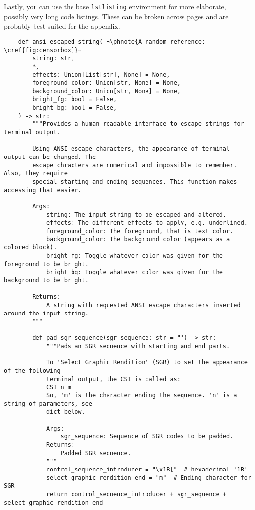 Lastly, you can use the base \texttt{lstlisting} environment for more elaborate,
possibly very long code listings.
These can be broken across pages and are probably best suited for the appendix.
\begin{lstlisting}
    def ansi_escaped_string( ¬\phnote{A random reference: \cref{fig:censorbox}}¬
        string: str,
        *,
        effects: Union[List[str], None] = None,
        foreground_color: Union[str, None] = None,
        background_color: Union[str, None] = None,
        bright_fg: bool = False,
        bright_bg: bool = False,
    ) -> str:
        """Provides a human-readable interface to escape strings for terminal output.
    
        Using ANSI escape characters, the appearance of terminal output can be changed. The
        escape chracters are numerical and impossible to remember. Also, they require
        special starting and ending sequences. This function makes accessing that easier.
    
        Args:
            string: The input string to be escaped and altered.
            effects: The different effects to apply, e.g. underlined.
            foreground_color: The foreground, that is text color.
            background_color: The background color (appears as a colored block).
            bright_fg: Toggle whatever color was given for the foreground to be bright.
            bright_bg: Toggle whatever color was given for the background to be bright.
    
        Returns:
            A string with requested ANSI escape characters inserted around the input string.
        """
    
        def pad_sgr_sequence(sgr_sequence: str = "") -> str:
            """Pads an SGR sequence with starting and end parts.
    
            To 'Select Graphic Rendition' (SGR) to set the appearance of the following
            terminal output, the CSI is called as:
            CSI n m
            So, 'm' is the character ending the sequence. 'n' is a string of parameters, see
            dict below.
    
            Args:
                sgr_sequence: Sequence of SGR codes to be padded.
            Returns:
                Padded SGR sequence.
            """
            control_sequence_introducer = "\x1B["  # hexadecimal '1B'
            select_graphic_rendition_end = "m"  # Ending character for SGR
            return control_sequence_introducer + sgr_sequence + select_graphic_rendition_end
    

\end{lstlisting}
